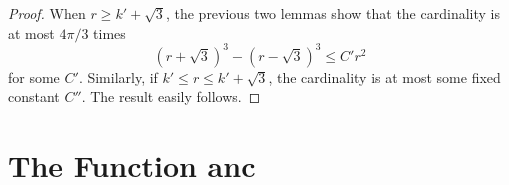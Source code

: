 \begin{proof}  When $r \ge k'+\sqrt3$, the previous two lemmas show
that the cardinality is at most $4\pi/3$ times
    $$(r + \sqrt3)^3 - (r - \sqrt3)^3 \le C' r^2$$
for some $C'$.  Similarly, if $k'\le r\le k'+\sqrt3$, the
cardinality is at most some fixed constant $C''$.  The result
easily follows.
\end{proof}



%
%
%
%

\section{The Function anc}
\label{sec:anc} %

